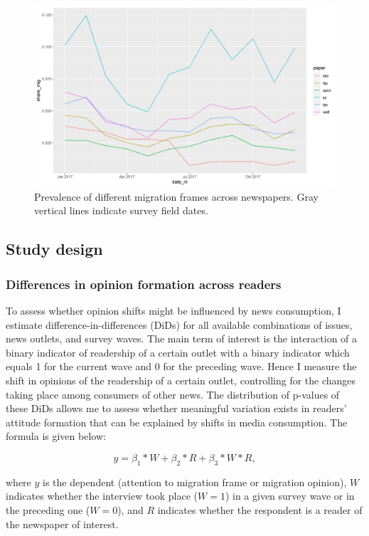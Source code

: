 \documentclass{article}
\begin{document}
\begin{figure}[!ht]
    \centering
    \includegraphics[width=\textwidth]{paper/vis/frames_papers_focus.png}
    \caption{Prevalence of different migration frames across newspapers. Gray vertical lines indicate survey field dates.}
    \label{fig:frames}
\end{figure}


\subsection{Study design}

\subsubsection{Differences in opinion formation across readers}

To assess whether opinion shifts might be influenced by news consumption, I estimate difference-in-differences (DiDs) for all available combinations of issues, news outlets, and survey waves. The main term of interest is the interaction of a binary indicator of readership of a certain outlet with a binary indicator which equals 1 for the current wave and 0 for the preceding wave. Hence I measure the shift in opinions of the readership of a certain outlet, controlling for the changes taking place among consumers of other news. The distribution of p-values of these DiDs allows me to assess whether meaningful variation exists in readers' attitude formation that can be explained by shifts in media consumption. The formula is given below:

$$ y = \beta_1 * W + \beta_2 * R + \beta_3 * W * R, $$

where $y$ is the dependent (attention to migration frame or migration opinion), $W$ indicates whether the interview took place ($W = 1$) in a given survey wave or in the preceding one ($W = 0$), and $R$ indicates whether the respondent is a reader of the newspaper of interest.
\end{document}
